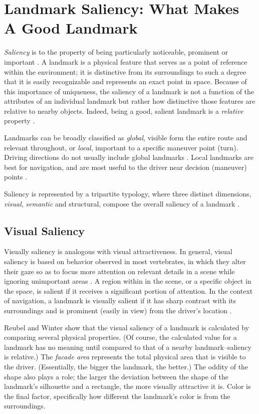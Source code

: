 \section{Landmark Saliency: What Makes A Good Landmark}\label{Sect:eqns}
\textit{Saliency} is to the property of being particularly noticeable, prominent or important \cite{saliency_dict}. A landmark is a physical feature that serves as a point of reference within the environment; it is distinctive from its surroundings to such a degree that it is easily recognizable and represents an exact point in space. Because of this importance of uniqueness, the saliency of a landmark is not a function of the attributes of an individual landmark but rather how distinctive those features are relative to nearby objects. Indeed, being a good, salient landmark is a \textit{relative} property \cite{raubal2002enriching}. 

Landmarks can be broadly classified as \textit{global}, visible form the entire route and relevant throughout, or \textit{local}, important to a specific maneuver point (turn). Driving directions do not usually include global landmarks \cite{sorrows1999nature}. Local landmarks are best for navigation, and are most useful to the driver near decision (maneuver) points \cite{lee2003effect}.

Saliency is represented by a tripartite typology, where three distinct dimensions, \textit{visual}, \textit{semantic} and \textit{}{structural}, compose the overall saliency of a landmark \cite{sorrows1999nature}. 

\subsection{Visual Saliency}
 Visually saliency is analogous with visual attractiveness. In general, visual saliency is based on behavior observed in most vertebrates, in which they alter their gaze so as to focus more attention on relevant details in a scene while ignoring unimportant areas \cite{harel2007graph}. A region within in the scene, or a specific object in the space, is salient if it receives a significant portion of attention. In the context of navigation, a landmark is visually salient if it has sharp contrast with its surroundings and is prominent (easily in view) from the driver's location \cite{sorrows1999nature}. 

Reubel and Winter \cite{raubal2002enriching} show that the visual saliency of a landmark is calculated by comparing several physical properties. (Of course, the calculated value for a landmark has no meaning until compared to that of a nearby landmark--saliency is relative.) The \textit{facade area} represents the total physical area that is visible to the driver. (Essentially, the bigger the landmark, the better.) The oddity of the shape also plays a role; the larger the deviation between the shape of the landmark's silhouette and a rectangle, the more visually attractive it is. Color is the final factor, specifically how different the landmark's color is from the surroundings.

